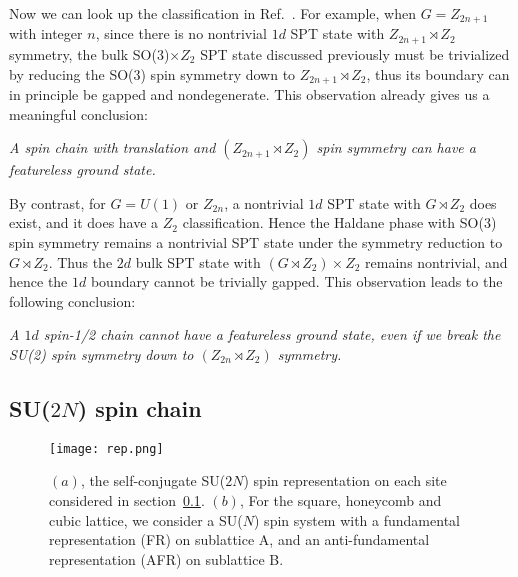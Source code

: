 \documentclass[aps,prb,twocolumn,superscriptaddress,showpacs]{revtex4}
\begin{document}
Now we can look up the classification in
Ref.~. For example, when $G = Z_{2n+1}$
with integer $n$, since there is no nontrivial $1d$ SPT state with
$Z_{2n+1} \rtimes Z_2$ symmetry, the bulk SO(3)$\times Z_2$ SPT
state discussed previously must be trivialized by reducing the
SO(3) spin symmetry down to $Z_{2n+1} \rtimes Z_2$, thus its
boundary can in principle be gapped and nondegenerate. This
observation already gives us a meaningful conclusion:

{\it A spin chain with translation and $(Z_{2n+1} \rtimes Z_2)$
spin symmetry can have a featureless ground state.}


By contrast, for $G = U(1)$ or $Z_{2n}$, a nontrivial $1d$ SPT
state with $G \rtimes Z_2$ does exist, and it does have a $Z_2$
classification. Hence the Haldane phase with SO(3) spin symmetry
remains a nontrivial SPT state under the symmetry reduction to $G
\rtimes Z_2$. Thus the $2d$ bulk SPT state with $(G \rtimes Z_2)
\times Z_2$ remains nontrivial, and hence the $1d$ boundary cannot
be trivially gapped. This observation leads to the following
conclusion:

{\it A $1d$ spin-1/2 chain cannot have a featureless ground state,
even if we break the SU(2) spin symmetry down to $(Z_{2n} \rtimes
Z_2)$ symmetry.}


\subsection{SU($2N$) spin chain}

\label{su2nchain}

\begin{figure}[tbp]
\begin{center}
\texttt{[image: rep.png]}
\caption{$(a)$, the self-conjugate SU($2N$) spin representation on
each site considered in section~\ref{su2nchain}. $(b)$, For the
square, honeycomb and cubic lattice, we consider a SU($N$) spin
system with a fundamental representation (FR) on sublattice A, and
an anti-fundamental representation (AFR) on sublattice B. }
\label{rep}
\end{center}
\end{figure}
\end{document}
